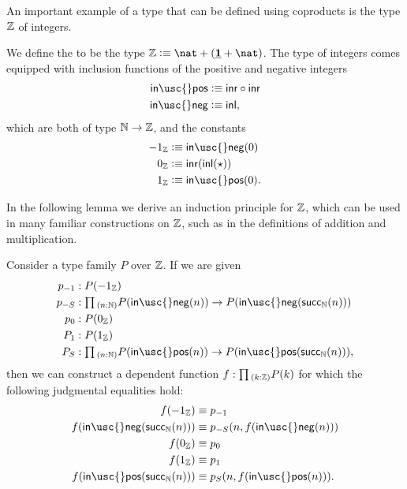 An important example of a type that can be defined using coproducts is the type ${\mathbb{Z}}$ of integers.

\begin{defn}
  We define the  to be the type $\Z\defeq\nat+(\unit+\nat)$. The type of integers comes equipped with inclusion functions of the positive and negative integers
  \begin{align*}
    \mathsf{in\usc{}pos} & \defeq \inr\circ\inr \\
    \mathsf{in\usc{}neg} & \defeq \inl,
  \end{align*}
  which are both of type ${\mathbb{N}}\to{\mathbb{Z}}$, and the constants
  \begin{align*}
    -1_\Z & \defeq \mathsf{in\usc{}neg}(0)\\
    0_\Z & \defeq \inr(\inl(\ttt))\\
    1_\Z & \defeq \mathsf{in\usc{}pos}(0).
  \end{align*}
\end{defn}

In the following lemma we derive an induction principle for ${\mathbb{Z}}$, which can be used in many familiar constructions on ${\mathbb{Z}}$, such as in the definitions of addition and multiplication.

\begin{lem}\label{lem:Z_ind}
  Consider a type family $P$ over ${\mathbb{Z}}$. If we are given
  \begin{align*}
    p_{-1} & :P(-1_\Z) \\
    p_{-S} & : \prd{n:\N}P(\mathsf{in\usc{}neg}(n))\to P(\mathsf{in\usc{}neg}(\succN(n)))\\
    p_{0} & : P(0_\Z) \\
    P_{1} & : P(1_\Z) \\
    P_{S} & : \prd{n:\N}P(\mathsf{in\usc{}pos}(n))\to P(\mathsf{in\usc{}pos}(\succN(n))),
  \end{align*}
  then we can construct a dependent function $f:\prd{k:\Z}P(k)$ for which the following judgmental equalities hold:
  \begin{align*}
    f(-1_\Z) & \jdeq p_{-1} \\
    f(\mathsf{in\usc{}neg}(\mathsf{succ}_\N(n))) & \jdeq p_{-S}(n,f(\mathsf{in\usc{}neg}(n))) \\
    f(0_\Z) & \jdeq p_{0} \\
    f(1_\Z) & \jdeq p_{1} \\
    f(\mathsf{in\usc{}pos}(\mathsf{succ}_\N(n))) & \jdeq p_S(n,f(\mathsf{in\usc{}pos}(n))).
  \end{align*}
\end{lem}

